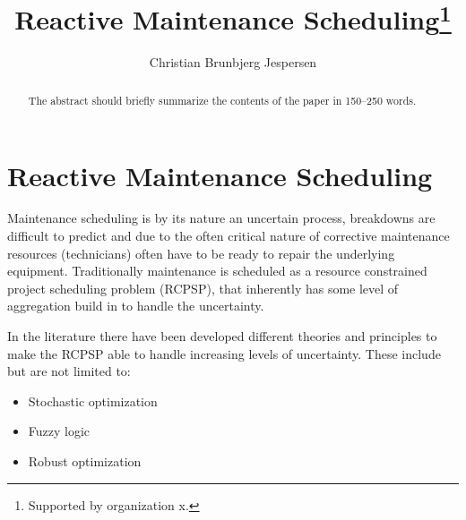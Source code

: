 \documentclass[runningheads]{llncs}
\begin{document}
%
\title{Reactive Maintenance Scheduling\thanks{Supported by organization x.}}
%
%
\author{Christian Brunbjerg Jespersen}
%
%
%
\maketitle              %
%
\begin{abstract}
The abstract should briefly summarize the contents of the paper in
150--250 words.

\end{abstract}
%
%
%
\section{Reactive Maintenance Scheduling}
Maintenance scheduling is by its nature an uncertain process, breakdowns are difficult to predict and due to the often critical nature of corrective maintenance resources (technicians) often have to be ready to repair the underlying equipment. Traditionally maintenance is scheduled as a resource constrained project scheduling problem (RCPSP), that inherently has some level of aggregation build in to handle the uncertainty. 

In the literature there have been developed different theories and principles to make the RCPSP able to handle increasing levels of uncertainty. These include but are not limited to:

\begin{itemize}
    \item Stochastic optimization
    \item Fuzzy logic
    \item Robust optimization
\end{itemize}
\end{document}

